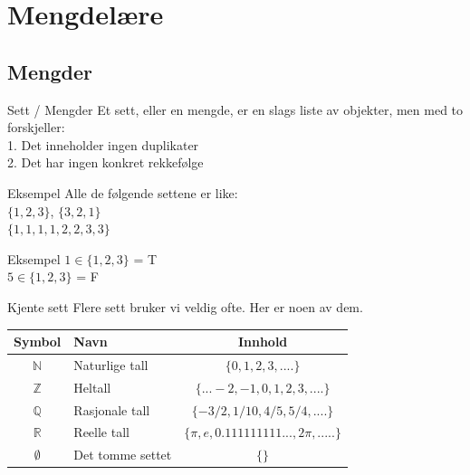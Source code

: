 \section{Mengdelære}
\subsection{Mengder}
\begin{frame}{Sett / Mengder}
    Et sett, eller en mengde, er en slags liste av objekter, men med to forskjeller:\\
    \indent \hspace{3mm}    1. Det inneholder ingen duplikater\\
    \indent \hspace{3mm}    2. Det har ingen konkret rekkefølge
    
    \pause
    \begin{block}{Eksempel}
        Alle de følgende settene er like: \\
        $\{1, 2, 3\}$, $\{3, 2, 1\}$ \\
        $\{1, 1, 1, 1, 2, 2, 3, 3\}$
    \end{block}
    
    \pause
    \begin{block}{Eksempel}
        $1 \in \{1, 2, 3\}$ = T \\
        $5 \in \{1, 2, 3\}$ = F
    \end{block}
\end{frame}


\begin{frame}{Kjente sett}
    Flere sett bruker vi veldig ofte. Her er noen av dem.\\
    
    \begin{tabular}{c|l|c}
        Symbol & Navn & Innhold \\ \hline
        $\mathbb{N}$ & Naturlige tall & $\{0, 1, 2, 3, ....\}$\\
        $\mathbb{Z}$ & Heltall & $\{... -2, -1, 0, 1, 2, 3, ....\}$\\
        $\mathbb{Q}$ & Rasjonale tall & $\{-3/2, 1/10, 4/5, 5/4, ....\}$\\
        $\mathbb{R}$ & Reelle tall & $\{\pi, e, 0.111111111..., 2\pi, .....\}$\\
        $\emptyset$ & Det tomme settet & $\{\}$
    \end{tabular}
    
\end{frame}

